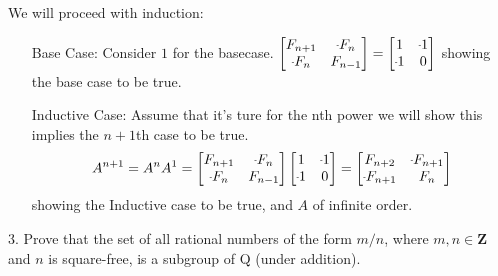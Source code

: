\begin{mdframed}[style=darkAnswer,frametitle={Joe Starr}]
  We will proceed with induction:
  \begin{itemize}[align=left]
    \item[Base Case:]{ Consider $1$ for the basecase. 
    $\begin{bmatrix}F_{n+1} & \m F_{n} \\
      \m F_{n} & F_{n-1} \\
    \end{bmatrix}=\begin{bmatrix}1 & \m 1 \\
      \m 1 & 0 \\
    \end{bmatrix}$ showing the base case to be true. 
    }
    \item[Inductive Case:]{ Assume that it's ture for the nth power we will show
    this implies the $n+1$th case to be true. 
    $$A^{n+1}=A^nA^1=\begin{bmatrix}F_{n+1} & \m F_{n} \\
      \m F_{n} & F_{n-1} \\
    \end{bmatrix}\begin{bmatrix}1 & \m 1 \\
      \m 1 & 0 \\
    \end{bmatrix}=\begin{bmatrix}F_{n+2} & \m F_{n+1} \\
      \m F_{n+1} & F_{n} \\
    \end{bmatrix}$$ showing the Inductive case to be true, and $A$ of infinite 
    order. 
    }
  \end{itemize}
\end{mdframed}
\newpage
\begin{mdframed}[style=darkQuesion]
  3. Prove that the set of all rational numbers of the form $m / n$, where $m, n \in \mathbf{Z}$ and $n$ is square-free, is a subgroup of Q (under addition).
    
\end{mdframed}

